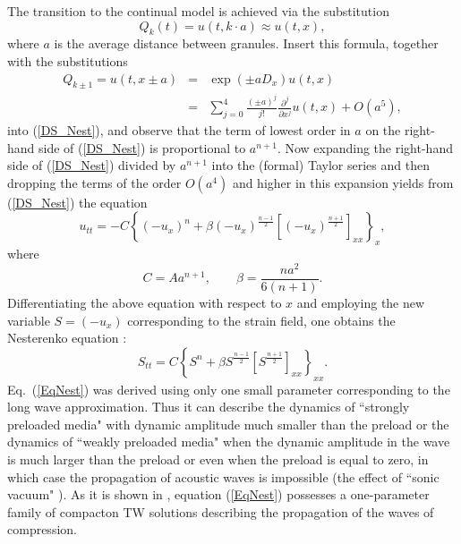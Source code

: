 \documentclass[12pt]{article}
\begin{document}
The transition to the continual model is achieved via the substitution
\begin{equation}\label{Contanalog}
Q_k(t)=u(t,k\cdot a) \approx u(t,x),
\end{equation}
where $a$ is the average distance between granules.
Insert this formula, together with the substitutions
\begin{equation}\label{ContShift}
\begin{array}{rcl}
Q_{k\pm 1}=u(t, x\pm a)&=&\exp(\pm a D_x)u(t, x)\\
&=&\displaystyle\sum_{j=0}^{4} \frac{(\pm a)^j}{j!}\frac{\partial^j}{\partial x^j}u(t, x)
+O\left(a^{5}\right),
\end{array}
\end{equation}
into (\ref{DS_Nest}), and observe that the term of lowest order in $a$ on the right-hand side of (\ref{DS_Nest}) is proportional to $a^{n+1}$. Now expanding the right-hand side of (\ref{DS_Nest}) divided by $a^{n+1}$ into the (formal) Taylor series and then dropping the terms of the order $O(a^{4})$ and higher in this expansion yields from (\ref{DS_Nest}) the equation
\[
u_{tt}=-C \left\{\left(-u_x  \right)^n+\beta \left(-u_x  \right)^\frac{n-1}{2} \left[\left(-u_x  \right)^\frac{n+1}{2}  \right]_{xx}   \right\}_x,
\]
where
\[
C=A a^{n+1}, \qquad \beta=\frac{n a^2}{6(n+1)}.
\]
Differentiating the above equation with respect to $x$ and employing the new variable $S=\left(-u_x  \right)$ corresponding to the strain field, one obtains the Nesterenko equation \cite{Nester_02}:
\begin{equation}\label{EqNest}
S_{tt}=C \left\{S^n+\beta S^\frac{n-1}{2} \left[S^\frac{n+1}{2}  \right]_{xx}   \right\}_{xx}.
\end{equation}
Eq.~(\ref{EqNest}) was derived using only one small parameter corresponding to the long wave approximation.  Thus it can describe the dynamics of ``strongly preloaded media" with dynamic amplitude much smaller than the preload or the dynamics of ``weakly preloaded media" when the dynamic amplitude in the wave is much larger than the preload or even when the preload is equal to zero, in which case the propagation of acoustic waves is impossible (the effect of ``sonic vacuum" \cite{Nester_94}).
As it is shown in \cite{Nester_02}, equation (\ref{EqNest}) possesses a one-parameter family of compacton TW solutions describing the propagation of the waves of compression.
\end{document}
